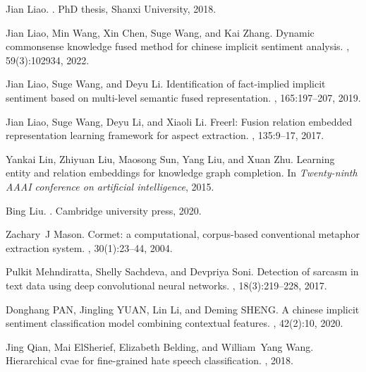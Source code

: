 \documentclass[11pt]{article}
\begin{document}
\begin{thebibliography}{10}
Jian Liao.
.
\newblock PhD thesis, Shanxi University, 2018.

Jian Liao, Min Wang, Xin Chen, Suge Wang, and Kai Zhang.
\newblock Dynamic commonsense knowledge fused method for chinese implicit
  sentiment analysis.
, 59(3):102934, 2022.

Jian Liao, Suge Wang, and Deyu Li.
\newblock Identification of fact-implied implicit sentiment based on
  multi-level semantic fused representation.
, 165:197--207, 2019.

Jian Liao, Suge Wang, Deyu Li, and Xiaoli Li.
\newblock Freerl: Fusion relation embedded representation learning framework
  for aspect extraction.
, 135:9--17, 2017.

Yankai Lin, Zhiyuan Liu, Maosong Sun, Yang Liu, and Xuan Zhu.
\newblock Learning entity and relation embeddings for knowledge graph
  completion.
\newblock In {\em Twenty-ninth AAAI conference on artificial intelligence},
  2015.

Bing Liu.
.
\newblock Cambridge university press, 2020.

Zachary~J Mason.
\newblock Cormet: a computational, corpus-based conventional metaphor
  extraction system.
, 30(1):23--44, 2004.

Pulkit Mehndiratta, Shelly Sachdeva, and Devpriya Soni.
\newblock Detection of sarcasm in text data using deep convolutional neural
  networks.
, 18(3):219--228,
  2017.

Donghang PAN, Jingling YUAN, Lin Li, and Deming SHENG.
\newblock A chinese implicit sentiment classification model combining
  contextual features.
, 42(2):10, 2020.

Jing Qian, Mai ElSherief, Elizabeth Belding, and William~Yang Wang.
\newblock Hierarchical cvae for fine-grained hate speech classification.
, 2018.


\end{thebibliography}
\end{document}
